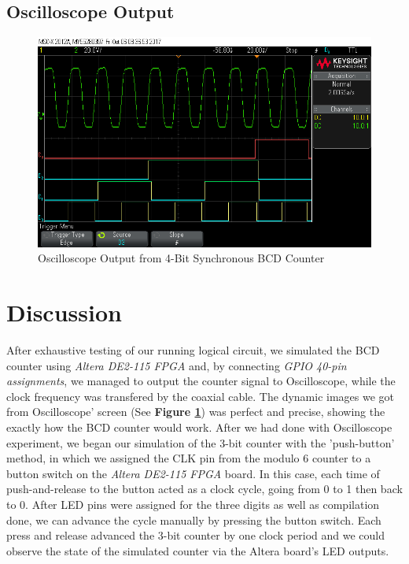 \documentclass[a4paper,12pt]{article}
\begin{document}
\subsection{Oscilloscope Output}

\begin{figure}[H]
\includegraphics[width=\textwidth]{Images/scope_4.png} 
\caption{Oscilloscope Output from 4-Bit Synchronous BCD Counter}
\label{fig:Scope}
\end{figure}


\section{Discussion}
After exhaustive testing of our running logical circuit, we simulated the BCD counter using \textit{Altera DE2-115 FPGA} and, by connecting \textit{GPIO 40-pin assignments}, we managed to output the counter signal to Oscilloscope, while the clock frequency was transfered by the coaxial cable. The dynamic images we got from Oscilloscope' screen (See \textbf{Figure \ref{fig:Scope}}) was perfect and precise, showing the exactly how the BCD counter would work. After we had done with Oscilloscope experiment, we began our simulation of the 3-bit counter with the 'push-button' method, in which we assigned the CLK pin from the modulo 6 counter to a button switch on the \textit{Altera DE2-115 FPGA} board. In this case, each time of push-and-release to the button acted as a clock cycle, going from 0 to 1 then back to 0. After LED pins were assigned for the three digits as well as compilation done, we can advance the cycle manually by pressing the button switch. Each press and release advanced the 3-bit counter by one clock period and we could observe the state of the simulated counter via the Altera board's LED outputs.
\end{document}
